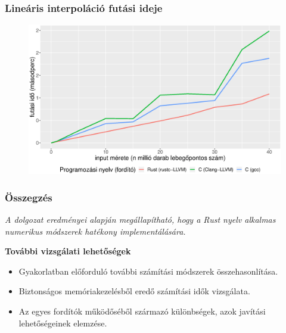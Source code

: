 \documentclass{beamer}
\begin{document}
\begin{frame}[fragile]
\frametitle{Lineáris interpoláció futási ideje}

\begin{figure}[htb]
\begin{center}
	\includegraphics[scale=0.4]{images/linear_interpolation_run_without_read.eps}
\end{center}
\end{figure}

\end{frame}

\begin{frame}[fragile]
\frametitle{Összegzés}

\emph{A dolgozat eredményei alapján megállapítható, hogy a Rust nyelv alkalmas numerikus módszerek hatékony implementálására.}

\vskip 8mm

\textbf{További vizsgálati lehetőségek}
\begin{itemize}
\item Gyakorlatban előforduló további számítási módszerek összehasonlítása.
\item Biztonságos memóriakezelésből eredő számítási idők vizsgálata.
\item Az egyes fordítók működőséből származó különbségek, azok javítási lehetőségeinek elemzése.
\end{itemize}

\end{frame}
\end{document}

